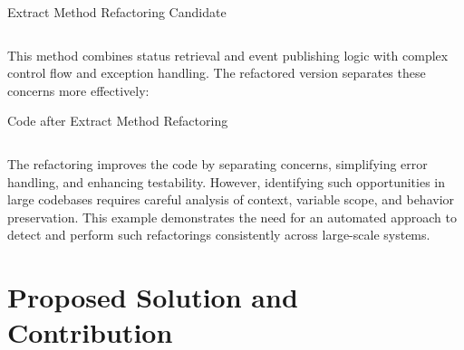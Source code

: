 \begin{listing}[H]
    \footnotesize
    \centering
    \caption{Extract Method Refactoring Candidate}
    \label{lst:branching_code}
    \inputminted[breaklines=true, breakafter=-, breaksymbolleft={},
    linenos=true, bgcolor=gray!10, highlightlines={16-25}]{java}{chapters/example_codes/motex.java}
\end{listing}

This method combines status retrieval and event publishing logic with complex control flow and exception handling.
The refactored version separates these concerns more effectively:


\begin{listing}[H]
    \footnotesize
    \centering
    \caption{Code after Extract Method Refactoring}
    \label{lst:branching_code}
    \inputminted[breaklines=true, breakafter=-, breaksymbolleft={},
    linenos=true, bgcolor=gray!10, highlightlines={15,19-25}]{java}{chapters/example_codes/motex2.java}
\end{listing}

The refactoring improves the code by separating concerns, simplifying error handling, and enhancing testability. However, identifying such opportunities in large codebases requires careful analysis of context, variable scope, and behavior preservation. This example demonstrates the need for an automated approach to detect and perform such refactorings consistently across large-scale systems.

\section{Proposed Solution and Contribution}

